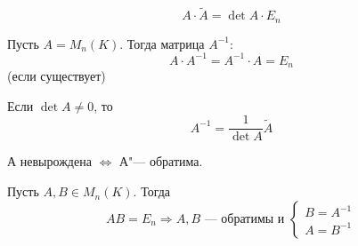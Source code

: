 \documentclass[12pt]{../../../notes}
\begin{document}
\begin{lem}\label{lem:adjointmtx}
  \[
    A\cdot\widetilde A = \det A \cdot E_n
  \]
\end{lem}

\begin{defn}\label{defn:invertmtx}
  Пусть $A = M_n(K)$. Тогда матрица $A^{-1}:$
  \[
    A\cdot A^{-1} = A^{-1} \cdot A = E_n
  \]
  (если существует)
\end{defn}

\begin{imp}
  Если $\det A \neq 0$, то
  \[
    A^{-1} = \frac{1}{\det A} \widetilde{A}
  \]
\end{imp}

\begin{imp}
  А невырождена $\Leftrightarrow$ А"--- обратима. 
\end{imp}

\begin{imp}
  Пусть $A,B \in M_n(K)$. Тогда 
  \[
    AB = E_n \Rightarrow A,B \text{~--- обратимы и } 
    \begin{cases}
      B = A^{-1} \\
      A = B^{-1}
    \end{cases}
  \]
\end{imp}
\end{document}
